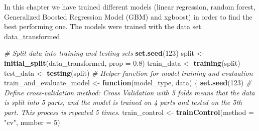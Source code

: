 \documentclass[
]{article}
\newenvironment{Shaded}{\begin{snugshade}}{\end{snugshade}}
\newcommand{\AttributeTok}[1]{\textcolor[rgb]{0.13,0.29,0.53}{#1}}
\newcommand{\CommentTok}[1]{\textcolor[rgb]{0.56,0.35,0.01}{\textit{#1}}}
\newcommand{\ControlFlowTok}[1]{\textcolor[rgb]{0.13,0.29,0.53}{\textbf{#1}}}
\newcommand{\DecValTok}[1]{\textcolor[rgb]{0.00,0.00,0.81}{#1}}
\newcommand{\FloatTok}[1]{\textcolor[rgb]{0.00,0.00,0.81}{#1}}
\newcommand{\FunctionTok}[1]{\textcolor[rgb]{0.13,0.29,0.53}{\textbf{#1}}}
\newcommand{\NormalTok}[1]{#1}
\newcommand{\OtherTok}[1]{\textcolor[rgb]{0.56,0.35,0.01}{#1}}
\newcommand{\StringTok}[1]{\textcolor[rgb]{0.31,0.60,0.02}{#1}}
\begin{document}
In this chapter we have trained different models (linear regression,
random forest, Generalized Boosted Regression Model (GBM) and xgboost)
in order to find the best performing one. The models were trained with
the data set data\_transformed.

\begin{Shaded}
\begin{Highlighting}[]
\CommentTok{\# Split data into training and testing sets}
\FunctionTok{set.seed}\NormalTok{(}\DecValTok{123}\NormalTok{)}
\NormalTok{split }\OtherTok{\textless{}{-}} \FunctionTok{initial\_split}\NormalTok{(data\_transformed, }\AttributeTok{prop =} \FloatTok{0.8}\NormalTok{)}
\NormalTok{train\_data }\OtherTok{\textless{}{-}} \FunctionTok{training}\NormalTok{(split)}
\NormalTok{test\_data }\OtherTok{\textless{}{-}} \FunctionTok{testing}\NormalTok{(split)}
\CommentTok{\# Helper function for model training and evaluation}
\NormalTok{train\_and\_evaluate\_model }\OtherTok{\textless{}{-}} \ControlFlowTok{function}\NormalTok{(model\_type, data) \{}
  \FunctionTok{set.seed}\NormalTok{(}\DecValTok{123}\NormalTok{)}
  \CommentTok{\# Define cross{-}validation method: Cross Validation with 5 folds means that the data is split into 5 parts, and the model is trained on 4 parts and tested on the 5th part. This process is repeated 5 times.}
\NormalTok{  train\_control }\OtherTok{\textless{}{-}} \FunctionTok{trainControl}\NormalTok{(}\AttributeTok{method =} \StringTok{"cv"}\NormalTok{, }\AttributeTok{number =} \DecValTok{5}\NormalTok{)}


\end{Highlighting}
\end{Shaded}
\end{document}
